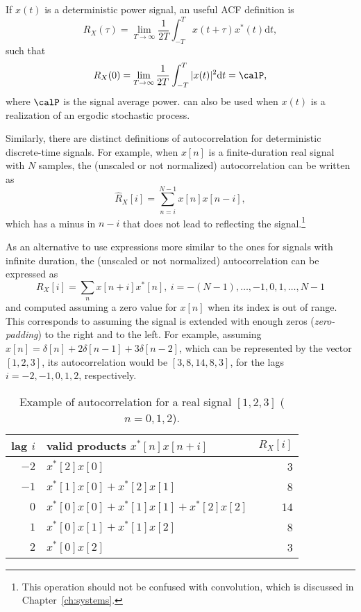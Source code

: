 If $x(t)$ is a deterministic power signal, an useful ACF definition is
\begin{equation}
R_{X}(\tau)  = \lim_{T \rightarrow \infty} \frac 1 {2T} \int_{-T}^{T} {x(t+\tau)x^*(t)} \textrm{d}t,
\label{eq:autocorrelation_power}
\end{equation}
such that 
\begin{equation}
R_X(0)= \lim_{T \rightarrow \infty} \frac 1 {2T} \int_{-T}^{T} |x(t)|^2 \textrm{d}t = \calP,
\label{eq:autocorrelationOriginIsPower}
\end{equation}
where $\calP$ is the signal average power.  can also be used when $x(t)$ is a realization of an ergodic stochastic process.


Similarly, there are distinct definitions of autocorrelation for deterministic discrete-time signals. For example, when $x[n]$ is a finite-duration real signal with $N$ samples, the (unscaled or not normalized) autocorrelation can be written as
\begin{equation}
\hat R_X[i] = \sum_{n=i}^{N-1} x[n] x[n-i],
\label{eq:xcorrFiniteDuration}
\end{equation}
which has a minus in $n-i$ that does not lead to reflecting the signal.\footnote{This operation should not be confused with convolution, which is discussed in Chapter~\ref{ch:systems}.}

As an alternative to use expressions more similar to the ones for signals with infinite duration, the (unscaled or not normalized) autocorrelation can be expressed as
\[
R_X[i] = \sum_n x[n+i] x^*[n],~i=-(N-1),\ldots,-1,0,1,\ldots,N-1
\]
and computed assuming a zero value for $x[n]$ when its index is out of range. This corresponds to assuming the signal is extended with enough zeros (\emph{zero-padding}) to the right and to the left. For example, assuming $x[n]=\delta[n]+2\delta[n-1]+3\delta[n-2]$, which can be represented by the vector $[1,2,3]$, its autocorrelation would be $[3,8,14,8,3]$, for the lags $i=-2,-1,0,1,2$, respectively.

\begin{table}
 \centering
 \caption{Example of autocorrelation for a real signal $[1,2,3]$ ($n=0,1,2$). \label{tab:autocorrelation}}
 \begin{tabularx}{\textwidth}{rXr}
 \toprule
 lag $i$ & valid products $x^*[n]x[n+i]$ & $R_X[i]$ \\\midrule
  $-2$ & $x^*[2] x[0]$ &  3 \\
 $-1$ & $x^*[1] x[0] + x^*[2] x[1] $ & 8 \\
 $0$ & $x^*[0] x[0] + x^*[1] x[1] + x^*[2] x[2] $ & 14 \\
 $1$ & $x^*[0] x[1] + x^*[1] x[2] $ & 8 \\
 $2$ & $x^*[0] x[2]$ &  3 \\\bottomrule
\end{tabularx}
\end{table}

